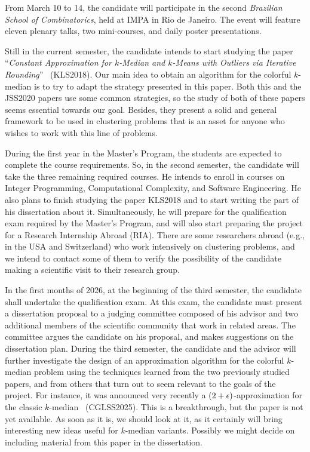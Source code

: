 \documentclass[12pt]{article}
\begin{document}
From March 10 to 14, the candidate will participate in the second \emph{Brazilian School of Combinatorics}, held at IMPA in Rio de Janeiro. 
The event will feature eleven plenary talks, two mini-courses, and daily poster presentations. 

Still in the current semester, the candidate intends to start studying the paper ``\emph{Constant Approximation for $k$-Median and $k$-Means with Outliers
via Iterative Rounding}''~\cite{KLS2018} (KLS2018). Our main idea to obtain an algorithm for the colorful $k$-median is to try to adapt the strategy presented in this paper.  Both this and the JSS2020 papers use some common strategies, so the study of both of these papers seems essential towards our goal.  Besides, they present a solid and general framework to be used in clustering problems that is an asset for anyone who wishes to work with this line of problems. 

During the first year in the Master's Program, the students are expected to complete the course requirements. 
So, in the second semester, the candidate will take the three remaining required courses.
He intends to enroll in courses on Integer Programming, Computational Complexity, and Software Engineering. 
He also plans to finish studying the paper KLS2018 and to start writing the part of his dissertation about it.
Simultaneously, he will prepare for the qualification exam required by the Master's Program, 
and will also start preparing the project for a Research Internship Abroad (RIA). 
There are some researchers abroad (e.g., in the USA and Switzerland) who work intensively on clustering problems, 
and we intend to contact some of them to verify the possibility of the candidate making a scientific visit to 
their research group.

In the first months of 2026, at the beginning of the third semester, the candidate shall undertake the qualification exam. 
At this exam, the candidate must present a dissertation proposal to a judging committee composed 
of his advisor and two additional members of the scientific community that work in related areas.
The committee argues the candidate on his proposal, and makes suggestions on the dissertation plan. 
During the third semester, the candidate and the advisor will further investigate the design of an approximation algorithm 
for the colorful $k$-median problem using the techniques learned from the two previously studied papers, 
and from others that turn out to seem relevant to the goals of the project.  For instance, it was announced 
very recently a $(2 + \epsilon)$-approximation for the classic $k$-median~\cite{CGLS2025} (CGLSS2025). 
This is a breakthrough, but the paper is not yet available. As soon as it is, 
we should look at it, as it certainly will bring interesting new ideas useful for $k$-median variants.
Possibly we might decide on including material from this paper in the dissertation.
\end{document}
